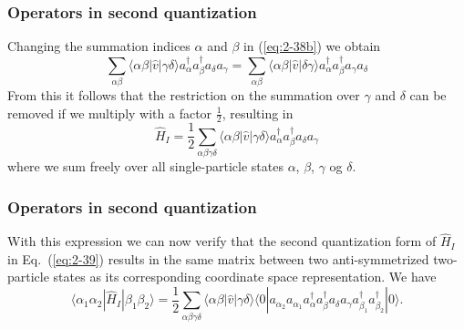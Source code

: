 \documentclass{beamer}
\begin{document}
\begin{frame}
\frametitle{Operators in second quantization}

\begin{block}{}
Changing the summation indices 
$\alpha$ and $\beta$ in (\ref{eq:2-38b}) we obtain
\begin{equation}
	\sum_{\alpha\beta} \langle \alpha\beta|\hat{v}|\gamma\delta\rangle a^{\dagger}_\alpha a^{\dagger}_\beta a_\delta a_\gamma =
		 \sum_{\alpha\beta} \langle \alpha\beta|\hat{v}|\delta\gamma\rangle 
		  a^{\dagger}_\alpha a^{\dagger}_\beta  a_\gamma a_\delta \label{eq:2-38c}
\end{equation}
From this it follows that the restriction on the summation over $\gamma$ and $\delta$ can be removed if we multiply with a factor $\frac{1}{2}$, resulting in 
\begin{equation}
	\hat{H}_I = \frac{1}{2} \sum_{\alpha\beta\gamma\delta} \langle \alpha\beta|\hat{v}|\gamma\delta\rangle
		a^{\dagger}_\alpha a^{\dagger}_\beta a_\delta a_\gamma \label{eq:2-39}
\end{equation}
where we sum freely over all single-particle states $\alpha$, 
$\beta$, $\gamma$ og $\delta$.
\end{block}
\end{frame}

\begin{frame}
\frametitle{Operators in second quantization}

\begin{block}{}
With this expression we can now verify that the second quantization form of $\hat{H}_I$ in Eq.~(\ref{eq:2-39}) 
results in the same matrix between two anti-symmetrized two-particle states as its corresponding coordinate
space representation. We have  
\begin{equation}
	\langle \alpha_1 \alpha_2|\hat{H}_I|\beta_1 \beta_2\rangle =
		\frac{1}{2} \sum_{\alpha\beta\gamma\delta}
			\langle \alpha\beta|\hat{v}|\gamma\delta\rangle \langle 0|a_{\alpha_2} a_{\alpha_1} 
			 a^{\dagger}_\alpha a^{\dagger}_\beta a_\delta a_\gamma 
			 a_{\beta_1}^{\dagger} a_{\beta_2}^{\dagger}|0\rangle. \label{eq:2-40}
\end{equation}
\end{block}
\end{frame}
\end{document}
